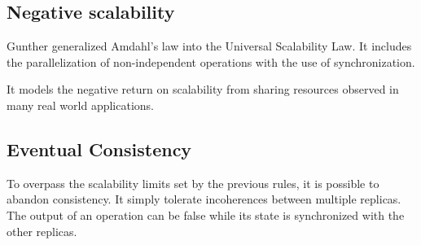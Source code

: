 
\subsection{Negative scalability}

Gunther generalized Amdahl's law into the Universal Scalability Law.
It includes the parallelization of non-independent operations with the use of synchronization.

It models the negative return on scalability from sharing resources observed in many real world applications.




\subsection{Eventual Consistency}

To overpass the scalability limits set by the previous rules, it is possible to abandon consistency.
It simply tolerate incoherences between multiple replicas.
The output of an operation can be false while its state is synchronized with the other replicas.



